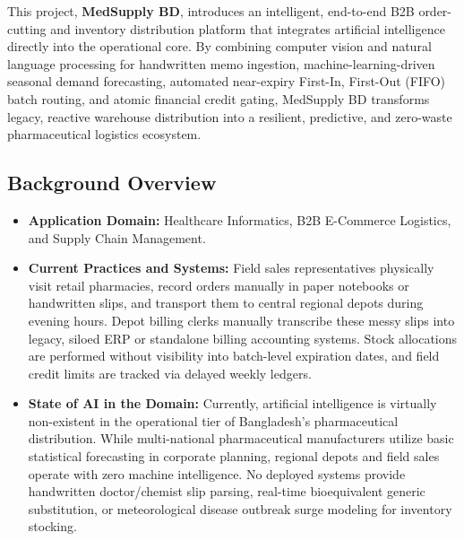 \documentclass[12pt,a4paper]{article}
\begin{document}
This project, \textbf{MedSupply BD}, introduces an intelligent, end-to-end B2B order-cutting and inventory distribution platform that integrates artificial intelligence directly into the operational core. By combining computer vision and natural language processing for handwritten memo ingestion, machine-learning-driven seasonal demand forecasting, automated near-expiry First-In, First-Out (FIFO) batch routing, and atomic financial credit gating, MedSupply BD transforms legacy, reactive warehouse distribution into a resilient, predictive, and zero-waste pharmaceutical logistics ecosystem.

\subsection{Background Overview}
\begin{itemize}
    \item \textbf{Application Domain:} Healthcare Informatics, B2B E-Commerce Logistics, and Supply Chain Management.
    \item \textbf{Current Practices and Systems:} Field sales representatives physically visit retail pharmacies, record orders manually in paper notebooks or handwritten slips, and transport them to central regional depots during evening hours. Depot billing clerks manually transcribe these messy slips into legacy, siloed ERP or standalone billing accounting systems. Stock allocations are performed without visibility into batch-level expiration dates, and field credit limits are tracked via delayed weekly ledgers.
    \item \textbf{State of AI in the Domain:} Currently, artificial intelligence is virtually non-existent in the operational tier of Bangladesh's pharmaceutical distribution. While multi-national pharmaceutical manufacturers utilize basic statistical forecasting in corporate planning, regional depots and field sales operate with zero machine intelligence. No deployed systems provide handwritten doctor/chemist slip parsing, real-time bioequivalent generic substitution, or meteorological disease outbreak surge modeling for inventory stocking.
\end{itemize}
\end{document}
